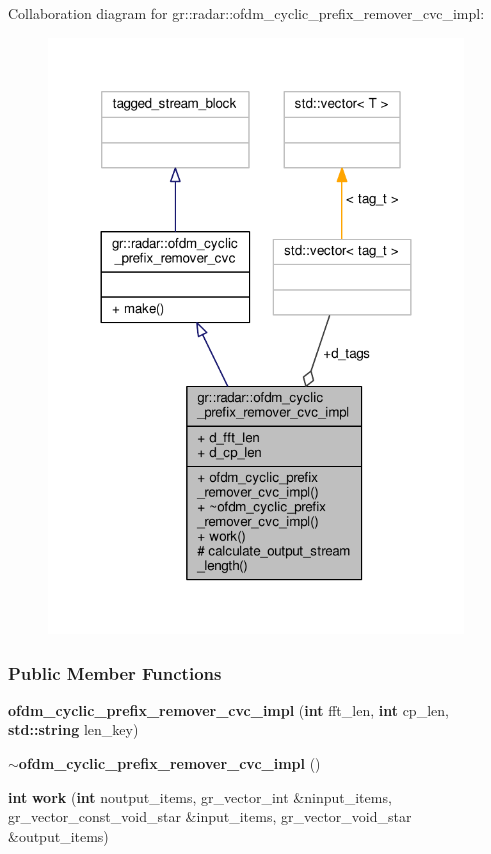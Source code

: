Collaboration diagram for gr\+:\+:radar\+:\+:ofdm\+\_\+cyclic\+\_\+prefix\+\_\+remover\+\_\+cvc\+\_\+impl\+:
\nopagebreak
\begin{figure}[H]
\begin{center}
\leavevmode
\includegraphics[width=312pt]{d1/d70/classgr_1_1radar_1_1ofdm__cyclic__prefix__remover__cvc__impl__coll__graph}
\end{center}
\end{figure}
\subsubsection*{Public Member Functions}
\begin{DoxyCompactItemize}
\item 
{\bf ofdm\+\_\+cyclic\+\_\+prefix\+\_\+remover\+\_\+cvc\+\_\+impl} ({\bf int} fft\+\_\+len, {\bf int} cp\+\_\+len, {\bf std\+::string} len\+\_\+key)
\item 
{\bf $\sim$ofdm\+\_\+cyclic\+\_\+prefix\+\_\+remover\+\_\+cvc\+\_\+impl} ()
\item 
{\bf int} {\bf work} ({\bf int} noutput\+\_\+items, gr\+\_\+vector\+\_\+int \&ninput\+\_\+items, gr\+\_\+vector\+\_\+const\+\_\+void\+\_\+star \&input\+\_\+items, gr\+\_\+vector\+\_\+void\+\_\+star \&output\+\_\+items)
\end{DoxyCompactItemize}
